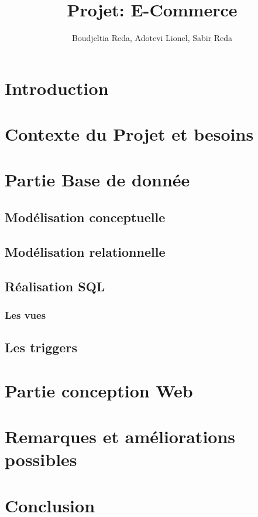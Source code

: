 \documentclass[11pt]{report}
\title{\LARGE Projet: E-Commerce }
\author{Boudjeltia Reda, Adotevi Lionel, Sabir Reda }
\begin{document}
\maketitle

\tableofcontents


\chapter*{Introduction}


\chapter{Contexte du Projet et besoins}


\chapter{Partie Base de donn\'ee}

\section{Mod\'elisation conceptuelle}
\section{Mod\'elisation relationnelle}
\section{R\'ealisation SQL}
\subsection{Les vues}
\section{Les triggers}


\chapter{Partie conception Web}

\section{}
\subsection{}



\chapter{Remarques et am\'eliorations possibles}




    



\chapter{Conclusion}
\end{document}
